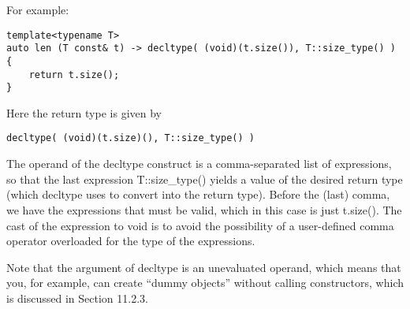 For example:

\begin{lstlisting}[style=styleCXX]
template<typename T>
auto len (T const& t) -> decltype( (void)(t.size()), T::size_type() )
{
	return t.size();
}
\end{lstlisting}

Here the return type is given by

\begin{lstlisting}[style=styleCXX]
decltype( (void)(t.size)(), T::size_type() )
\end{lstlisting}

The operand of the decltype construct is a comma-separated list of expressions, so that the last expression T::size\_type() yields a value of the desired return type (which decltype uses to convert into the return type). Before the (last) comma, we have the expressions that must be valid, which in this case is just t.size(). The cast of the expression to void is to avoid the possibility of a user-defined comma operator overloaded for the type of the expressions.

Note that the argument of decltype is an unevaluated operand, which means that you, for example, can create “dummy objects” without calling constructors, which is discussed in Section 11.2.3.























